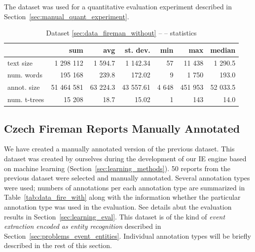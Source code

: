 The dataset was used for a quantitative evaluation experiment described in Section~\ref{sec:manual_quant_experiment}. 


\begin{table}
\centering
\begin{tabular}{|l|r|r|r|r|r|r|}
\hline
 & sum & avg & st. dev. & min & max & median\\
\hline
text size    &  1 298 112 &  1 594.7 &  1 142.34 &    57 &  11 438 &  1 290.5\\
num. words   &    195 168 &    239.8 &    172.02 &     9 &   1 750 &    193.0\\
annot. size  & 51 464 581 & 63 224.3 & 43 557.61 & 4 648 & 451 953 & 52 033.5\\
num. t-trees &     15 208 &     18.7 &     15.02 &     1 &     143 &     14.0\\
\hline
\end{tabular}
\caption{Dataset \ref{sec:data_fireman_without} --  -- statistics} \label{tab:data_fire_without}
\end{table}


\subsection{Czech Fireman Reports Manually Annotated} \label{sec:data_fireman_annotated}

We have created a manually annotated version of the previous dataset. 
This dataset was created by ourselves during the development of our IE  engine based on machine learning (Section~\ref{sec:learning_methods}). 50 reports from the previous dataset were selected and manually annotated. 
 Several annotation types were used; numbers of annotations per each annotation type are summarized in Table~\ref{tab:data_fire_with} along with the information whether the particular annotation type was used in the evaluation. See details abut the evaluation results in Section~\ref{sec:learning_eval}. 
This dataset is of the kind of \emph{event extraction encoded as entity recognition} described in Section~\ref{sec:problems_event_entities}.
Individual annotation types will be briefly described in the rest of this section.


